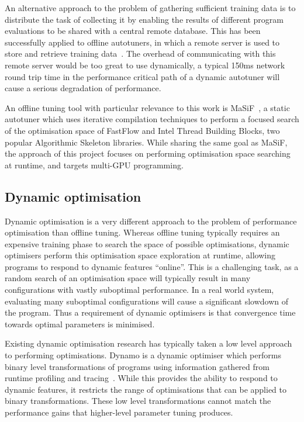 An alternative approach to the problem of gathering sufficient
training data is to distribute the task of collecting it by enabling
the results of different program evaluations to be shared with a
central remote database. This has been successfully applied to offline
autotuners, in which a remote server is used to store and retrieve
training data~\cite{Fursin2014, Auler2014}. The overhead of
communicating with this remote server would be too great to use
dynamically, a typical 150ms network round trip time in the
performance critical path of a dynamic autotuner will cause a serious
degradation of performance.

An offline tuning tool with particular relevance to this work is
MaSiF~\cite{Collins2013}, a static autotuner which uses iterative
compilation techniques to perform a focused search of the optimisation
space of FastFlow and Intel Thread Building Blocks, two popular
Algorithmic Skeleton libraries. While sharing the same goal as MaSiF,
the approach of this project focuses on performing optimisation space
searching at runtime, and targets multi-GPU programming.

\subsection{Dynamic optimisation}\label{subsec:dynamic-optimisation}
Dynamic optimisation is a very different approach to the problem of
performance optimisation than offline tuning. Whereas offline tuning
typically requires an expensive training phase to search the space of
possible optimisations, dynamic optimisers perform this optimisation
space exploration at runtime, allowing programs to respond to dynamic
features ``online''. This is a challenging task, as a random search of
an optimisation space will typically result in many configurations
with vastly suboptimal performance. In a real world system, evaluating
many suboptimal configurations will cause a significant slowdown of
the program. Thus a requirement of dynamic optimisers is that
convergence time towards optimal parameters is minimised.

Existing dynamic optimisation research has typically taken a low level
approach to performing optimisations. Dynamo is a dynamic optimiser
which performs binary level transformations of programs using
information gathered from runtime profiling and
tracing~\cite{Bala2000}. While this provides the ability to respond to
dynamic features, it restricts the range of optimisations that can be
applied to binary transformations. These low level transformations
cannot match the performance gains that higher-level parameter tuning
produces.

